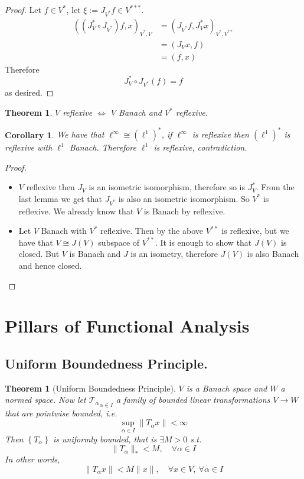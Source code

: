 \documentclass[11pt,a4paper]{article}
\theoremstyle{definition}
\theoremstyle{plain}
\newtheorem{theorem}[definition]{Theorem}
\newtheorem{corollary}[definition]{Corollary}
\theoremstyle{remark}
\renewcommand{\set}[1]{\left\{ #1 \right\}}
\newcommand{\norm}[1]{\lVert #1 \rVert}
\newcommand{\1}{\mathbbm{1}}
\begin{document}
\begin{proof}
    Let $f \in V^*$, let $\xi := J_{V^*} f \in V^{***}$. 
    \begin{align*}
        ((J_V^* \circ J_{V^*}) f, x)_{V^*, V} &= (J_{V^*}f, J_V^*x)_{V^*, V^{**}} \\
        &= (J_Vx, f) \\
        &= (f, x)
    \end{align*} 
    Therefore 
    $$J_V^* \circ J_{V^*} (f) = f$$
    as desired.   
\end{proof}

\begin{theorem}
    $V$ reflexive $\iff$ $V$ Banach and $V^*$ reflexive.
\end{theorem}

\begin{corollary}
    We have that $\ell^\infty \cong (\ell^1)^*$, if $\ell^\infty$ is reflexive then $(\ell^1)^*$ is reflexive with $\ell^1$ Banach. Therefore $\ell^1$ is reflexive, contradiction.
\end{corollary}

\begin{proof}
    \begin{itemize}
        \item[$\implies$] $V$ reflexive then $J_V$ is an isometric isomorphism, therefore so is $J_V^*$. From the last lemma we get that $J_{V^*}$ is also an 
        isometric isomorphism. So $V^*$ is reflexive. We already know that $V$ is Banach by reflexive.

        \item[$\impliedby$] Let $V$ Banach with $V^*$ reflexive. Then by the above $V^{**}$ is reflexive, but we have that $V \cong J(V)$ subspace of $V^{**}$.
        It is enough to show that $J(V)$ is closed. But $V$ is Banach and $J$ is an isometry, therefore $J(V)$ is also Banach and hence closed.
    \end{itemize}
\end{proof}

\section{Pillars of Functional Analysis}

\subsection{Uniform Boundedness Principle.} 

\begin{theorem}[Uniform Boundedness Principle]
   $V$ is a Banach space and $W$ a normed space. Now let $\mathcal{T_\alpha}_{\alpha \in I}$ a family of bounded linear transformations $V \to W$ that are pointwise bounded, i.e. 
   $$\sup_{\alpha \in I} \norm{T_\alpha x} < \infty$$
   Then $\set{T_\alpha}$ is uniformly bounded, that is $\exists M > 0$ s.t. 
   $$\norm{T_\alpha}_* < M, \quad \forall \alpha \in I$$
   In other words, 
   $$\norm{T_\alpha x} < M \norm{x}, \quad \forall x \in V, \ \forall \alpha \in I$$ 
\end{theorem}
\end{document}
